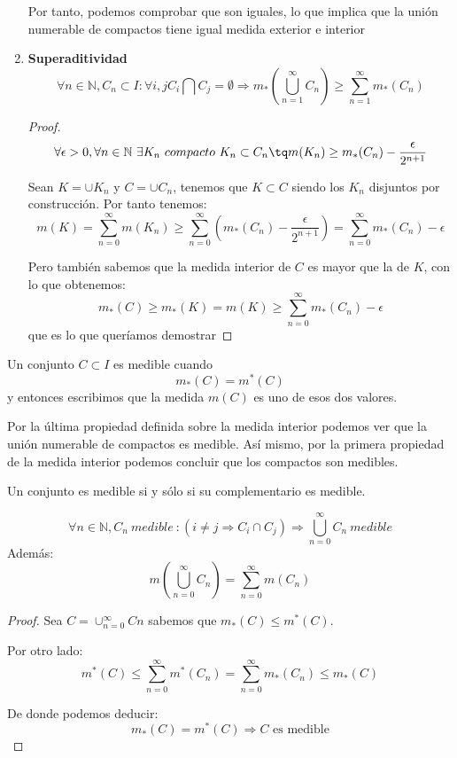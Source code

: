 \documentclass{apuntes}
\begin{document}
\begin{enumerate}
Por tanto, podemos comprobar que son iguales, lo que implica que la unión numerable de compactos tiene igual medida exterior e interior

%
\item \textbf{Superaditividad}
\[\forall n \in \mathbb{N}, C_n \subset I : \forall i,j C_i \bigcap C_j = \emptyset \Rightarrow m_*(\bigcup_{n=1}^{\infty} C_n) \geq \sum_{n=1}^{\infty}m_*(C_n)\]

\begin{proof}
\[ \forall \epsilon > 0, \forall n \in \mathbb{N} \ \exists K_n \ compacto \ K_n \subset C_n \tq m(K_n) \geq m_*(C_n) - \frac{\epsilon}{2^{n+1}}\]

Sean $K=\cup K_n$ y $C=\cup C_n$, tenemos que $K\subset C$  siendo los $K_n$ disjuntos por construcción. Por tanto tenemos:
\[m(K) = \sum _{n=0}^{\infty}m(K_n) \geq \sum _{n=0}^{\infty}(m_*(C_n)- \frac{\epsilon}{2^{n+1}}) = \sum_{n=0}^{\infty} m_*(C_n) - \epsilon\]

Pero también sabemos que la medida interior de $C$ es mayor que la de $K$, con lo que obtenemos:
\[m_*(C) \geq m_*(K) = m(K) \geq \sum_{n=0}^{\infty} m_*(C_n) - \epsilon\]
que es lo que queríamos demostrar
\end{proof}
\end{enumerate}

\begin{defn}[Medibilidad]
Un conjunto $C \subset I$ es medible cuando
\[m_*(C)=m^*(C)\]
y entonces escribimos que la medida $m(C)$ es uno de esos dos valores.
\end{defn}

Por la última propiedad definida sobre la medida interior podemos ver que la unión numerable de compactos es medible. Así mismo, por la primera propiedad de la medida interior podemos concluir que los compactos son medibles.

\obs Un conjunto es medible si y sólo si su complementario es medible.

\begin{prop}
\[\forall n \in \mathbb{N}, C_n \ medible \ : (i \neq j \Rightarrow C_i \cap C_j) \Rightarrow \bigcup_{n=0}^{\infty} C_n \ medible\]
Además:
\[m(\bigcup_{n=0}^{\infty}C_n) = \sum_{n=0}^{\infty} m(C_n)\]
\end{prop}
\begin{proof}
Sea $C=\cup_{n=0}^{\infty} Cn$  sabemos que $m_*(C) \leq m^*(C)$.

Por otro lado:
\[m^*(C) \leq \sum_{n=0}^{\infty}m^*(C_n) = \sum_{n=0}^{\infty}m_*(C_n) \leq m_*(C) \]

De donde podemos deducir:
\[m_*(C) = m^*(C) \Rightarrow C \text{ es  medible} \]
\end{proof}
\end{document}
